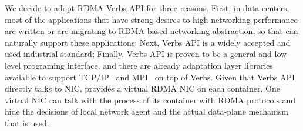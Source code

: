  We decide to adopt 
RDMA-Verbs API for three reasons. First, in data centers, most of
the applications that have strong desires to high networking performance
are written or are migrating to RDMA based networking abstraction, so that
\sysname can naturally support these applications; Next, Verbs API is a 
widely accepted and used industrial standard; Finally, Verbs API is proven
to be a general and low-level programing interface, and there are already
adaptation layer libraries available to support TCP/IP~\cite{?}
and MPI~\cite{?} on top of Verbs. Given that Verbs API directly talks to
NIC, \sysname provides a virtual RDMA NIC on each container. One virtual NIC
can talk with the process of its container with RDMA protocols and hide
the decisions of local network agent and the actual data-plane mechanism
that is used. 